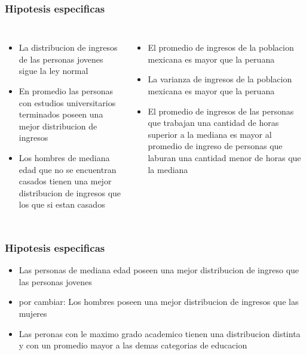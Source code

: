 \documentclass{beamer}
\begin{document}
\begin{frame}
\frametitle{Hipotesis especificas}

\begin{columns}

\begin{itemize}
    \item La distribucion de ingresos de las personas jovenes sigue
      la ley normal
    \item En \alert{promedio} las personas con
      estudios universitarios terminados poseen una mejor distribucion
      de ingresos
    \item Los hombres de mediana edad que no se encuentran casados
      tienen una mejor distribucion de ingresos que los que si estan casados
\end{itemize}


\begin{itemize}
    \item El promedio de ingresos de la poblacion mexicana es mayor
      que la peruana
    \item La varianza de ingresos de la poblacion mexicana es mayor
      que la peruana
    \item El \alert{promedio de ingresos} de las personas que trabajan
      una cantidad de horas superior a la mediana es mayor al promedio
      de ingreso de personas que laburan una cantidad menor de horas
      que la mediana
\end{itemize}
\end{columns}
\end{frame}


\begin{frame}
\frametitle{Hipotesis especificas}
\begin{itemize}
    \item Las personas de mediana edad poseen una mejor distribucion
      de ingreso que las personas jovenes
    \item \alert{por cambiar:} Los hombres poseen una mejor distribucion de ingresos
      que las mujeres
    \item Las peronas con le maximo grado academico tienen una distribucion
      distinta y con un promedio mayor a las demas categorias de educacion
\end{itemize}

\end{frame}
\end{document}
